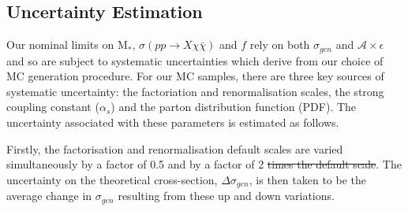 \subsection{Uncertainty Estimation}
\begin{flushleft}
Our nominal limits on M$_{*}$, $\sigma(pp \rightarrow X\chi\bar{\chi})$ and $f$ rely on both $\sigma_{gen}$ and $\mathcal{A}\times\epsilon$ and so are subject to systematic uncertainties which derive from our choice of MC generation procedure. For our MC samples, there are three key sources of systematic uncertainty: the factoriation and renormalisation scales, the strong coupling constant ($\alpha_{s}$) and the parton distribution function (PDF). The uncertainty associated with these parameters is estimated as follows.
\bigskip

%
%
Firstly, the factorisation and renormalisation default scales are varied simultaneously by a factor of 0.5  and by a factor of 2  \st{times the default scale}. The uncertainty on the theoretical cross-section, $\Delta \sigma_{gen}$, is then taken to be the average change in $\sigma_{gen}$ resulting from these up and down variations.
\bigskip


\end{flushleft}
